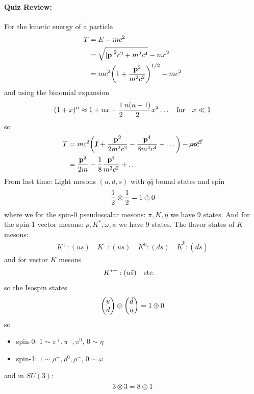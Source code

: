 \documentclass[../main.tex]{subfiles}
\begin{document}
\paragraph*{Quiz Review:}
For the kinetic energy of a particle
\begin{align*}
    T &= E - mc^2 \\
    &= \sqrt{\abs{\vb p}^2c^2 + m^2c^4} - mc^2 \\
    &= mc^2\qt(1 + \frac{\vb p^2}{m^2c^2})^{1/2} - mc^2 \\
\end{align*}
and using the binomial expansion
\begin{align*}
    (1 + x)^n \approx 1 + nx + \frac{1}{2} \frac{n(n-1)}{2} x^2 \dots \qqtext{for} x \ll 1
\end{align*}
so
\begin{align*}
    T &= mc^2 \qt(\cancel 1 + \frac{\vb p^2}{2m^2c^2} - \frac{\vb p^4}{8m^4c^4} + \dots) - \cancel {mc^2} \\
    &= \frac{\vb p^2}{2m} - \frac{1}{8} \frac{\vb p^4}{m^3c^2} + \dots
\end{align*}
From last time: Light mesons $(u, d, s)$ with $q\bar q$ bound states and spin
\begin{align*}
    \frac{1}{2} \otimes \frac{1}{2} = 1 \oplus 0
\end{align*}
where we for the spin-0 pseudoscalar mesons: $\pi, K, \eta$ we have 9 states. And for the spin-1
vector mesons: $\rho, K^*, \omega, \phi$ we have 9 states. The flavor states of $K$ mesons:
\begin{align*}
    K^+: (u\bar s) \quad K^-:(\bar u s) \quad K^0: (d\bar s) \quad \bar K^0: (\bar d s)
\end{align*}
and for vector $K$ mesons
\begin{align*}
    K^{*+}: (u \bar s) \qqtext{etc.}
\end{align*}
so the Isospin states
\begin{align*}
    \mqty(u \\ d) \otimes \mqty(\bar d \\ \bar u) = 1 \oplus 0
\end{align*}
so 
\begin{itemize}
    \item spin-0: $1\sim \pi^+, \pi^-, \pi^0$, $0 \sim \eta$
    \item spin-1: $1 \sim \rho^+, \rho^0, \rho^-$, $0 \sim \omega$
\end{itemize}
and in $SU(3)$: 
\begin{align*}
    3 \otimes \bar 3 = 8 \oplus 1
\end{align*}
\end{document}
